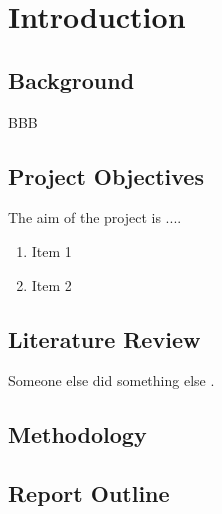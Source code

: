 \chapter{Introduction}


\section{Background}
\ac{BBB}

\section{Project Objectives}

The aim of the project is ....

\begin{enumerate}
    \item Item 1
    \item Item 2

\end{enumerate}

\section{Literature Review}
Someone else did something else \cite{Nicotra2014}.

\section{Methodology}

\section{Report Outline}

